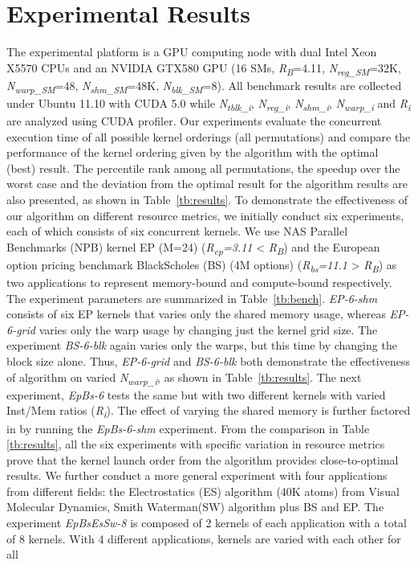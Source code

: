 \documentclass[twocolumn]{el-author}
\begin{document}
\section{Experimental Results}
The experimental platform is a GPU computing node with dual Intel Xeon X5570 CPUs and an NVIDIA GTX580 GPU (16 SMs, \emph{R\textsubscript{B}}={4.11}, \emph{N\textsubscript{reg\_SM}}=32K, \emph{N\textsubscript{warp\_SM}}=48, \emph{N\textsubscript{shm\_SM}}=48K, \emph{N\textsubscript{blk\_SM}}=8). All benchmark results are collected under Ubuntu 11.10 with CUDA 5.0 while \emph{N\textsubscript{tblk\_i}}, \emph{N\textsubscript{reg\_i}}, \emph{N\textsubscript{shm\_i}}, \emph{N\textsubscript{warp\_i}} and \emph{R\textsubscript{i}} are analyzed using CUDA profiler. Our experiments evaluate the concurrent execution time of all possible kernel orderings (all permutations) and compare the performance of the kernel ordering given by the algorithm with the optimal (best) result. The percentile rank among all permutations, the speedup over the worst case and the deviation from the optimal result for the algorithm results are also presented, as shown in Table~\ref{tb:results}. To demonstrate the effectiveness of our algorithm on different resource metrics, we initially conduct six experiments, each of which consists of six concurrent kernels. We use NAS Parallel Benchmarks (NPB) kernel EP (M=24) (\emph{R\textsubscript{ep}=3.11} < \emph{R\textsubscript{B}}) \cite{CPE:CPE1860} and the European option pricing benchmark BlackScholes (BS) (4M options) (\emph{R\textsubscript{bs}=11.1} > \emph{R\textsubscript{B}}) as two applications to represent memory-bound and compute-bound respectively. The experiment parameters are summarized in Table~\ref{tb:bench}.  \emph{EP-6-shm} consists of six EP kernels that varies only the shared memory usage, whereas \emph{EP-6-grid} varies only the warp usage by changing just the kernel grid size. 
 The experiment \emph{BS-6-blk} again varies only the warps, but this time by changing the block size alone. Thus, \emph{EP-6-grid} and \emph{BS-6-blk} both demonstrate the effectiveness of algorithm on varied \emph{N\textsubscript{warp\_i}}, as shown in Table~\ref{tb:results}. The next experiment, \emph{EpBs-6} tests the same but with two different kernels with varied Inst/Mem ratios (\emph{R\textsubscript{i}}).  The effect of varying the shared memory is further factored in by running the \emph{EpBs-6-shm} experiment.  
From the comparison in Table \ref{tb:results}, all the six experiments with specific variation in resource metrics prove that the kernel launch order from the algorithm provides close-to-optimal results. We further conduct a more general experiment with four applications from different fields: the Electrostatics (ES) algorithm (40K atoms) from Visual Molecular Dynamics, Smith Waterman(SW) algorithm plus BS and EP. The experiment \emph{EpBsEsSw-8} is composed of 2 kernels of each application with a total of 8 kernels. With 4 different applications, kernels are varied with each other for all 
\end{document}
